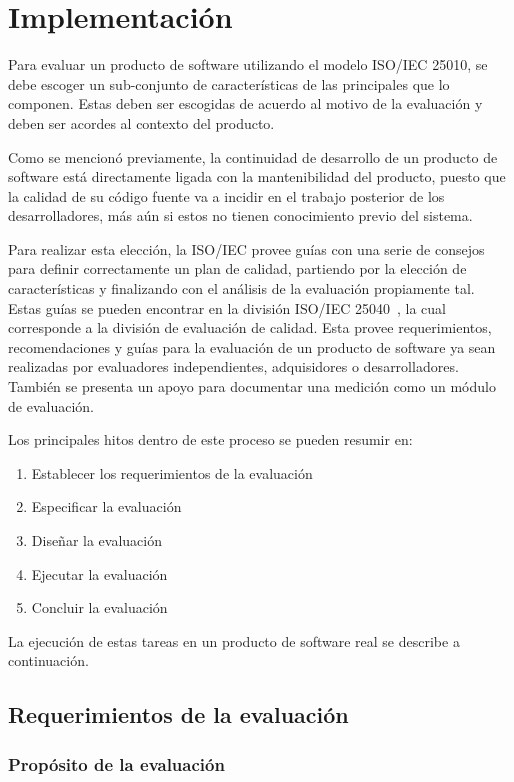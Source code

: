 \chapter{Implementación}
Para evaluar un producto de software utilizando el modelo ISO/IEC 25010, se debe escoger un sub-conjunto
de características de las principales que lo componen. Estas deben ser escogidas de acuerdo
al motivo de la evaluación y deben ser acordes al contexto del producto.

Como se mencionó previamente, la continuidad de desarrollo de un producto de software está directamente
ligada con la mantenibilidad del producto, puesto que la calidad de su código fuente va a incidir
en el trabajo posterior de los desarrolladores, más aún si estos no tienen conocimiento previo del sistema.

Para realizar esta elección, la ISO/IEC provee guías con una serie de consejos para definir correctamente
un plan de calidad, partiendo por la elección de características y finalizando con el análisis de la evaluación
propiamente tal. Estas guías se pueden encontrar en la división ISO/IEC 25040~\cite{25040}, la cual corresponde a la división
de evaluación de calidad. Esta provee requerimientos, recomendaciones y guías para
la evaluación de un producto de software ya sean realizadas por evaluadores independientes, adquisidores o
desarrolladores. También se presenta un apoyo para documentar una medición como un módulo de evaluación.

Los principales hitos dentro de este proceso se pueden resumir en:
\begin{enumerate}
    \item Establecer los requerimientos de la evaluación
    \item Especificar la evaluación
    \item Diseñar la evaluación
    \item Ejecutar la evaluación
    \item Concluir la evaluación
\end{enumerate}

La ejecución de estas tareas en un producto de software real se describe a continuación.

\section{Requerimientos de la evaluación}

\subsection{Propósito de la evaluación}

